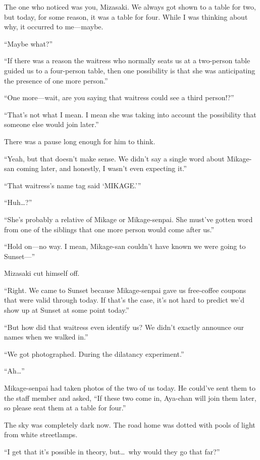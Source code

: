 \documentclass[
    a4paper,
    12pt,
    twoside,
    openany,
    UTF8,
    fontset=windows
]{ctexbook}
\begin{document}
The one who noticed was you, Mizasaki. We always got shown to a table for two, but today, for some reason, it was a table for four. While I was thinking about why, it occurred to me---maybe.

``Maybe what?''

``If there was a reason the waitress who normally seats us at a two-person table guided us to a four-person table, then one possibility is that she was anticipating the presence of one more person.''

``One more---wait, are you saying that waitress could see a third person!?''

``That's not what I mean. I mean she was taking into account the possibility that someone else would join later.''

There was a pause long enough for him to think.

``Yeah, but that doesn't make sense. We didn't say a single word about Mikage-san coming later, and honestly, I wasn't even expecting it.''

``That waitress's name tag said `MIKAGE.'''

``Huh\dots?''

``She's probably a relative of Mikage or Mikage-senpai. She must've gotten word from one of the siblings that one more person would come after us.''

``Hold on---no way. I mean, Mikage-san couldn't have known we were going to Sunset---''

Mizasaki cut himself off.

``Right. We came to Sunset because Mikage-senpai gave us free-coffee coupons that were valid through today. If that's the case, it's not hard to predict we'd show up at Sunset at some point today.''

``But how did that waitress even identify us? We didn't exactly announce our names when we walked in.''

``We got photographed. During the dilatancy experiment.''

``Ah\dots''

Mikage-senpai had taken photos of the two of us today. He could've sent them to the staff member and asked, ``If these two come in, Aya-chan will join them later, so please seat them at a table for four.''

The sky was completely dark now. The road home was dotted with pools of light from white streetlamps.

``I get that it's possible in theory, but\dots\ why would they go that far?''
\end{document}
